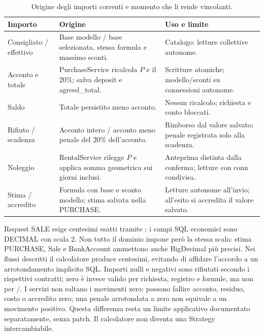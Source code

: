 \begin{table}[htbp]
\centering\small
\caption{Origine degli importi correnti e momento che li rende vincolanti.}\label{tab:impl-importi}
\begin{tabular}{>{\raggedright\arraybackslash}p{.20\linewidth}>{\raggedright\arraybackslash}p{.43\linewidth}>{\raggedright\arraybackslash}p{.27\linewidth}}
\textbf{Importo} & \textbf{Origine} & \textbf{Uso e limite}\\\hline
Consigliato / effettivo & Base modello / base selezionata, stessa formula e massimo sconti. & Catalogo: letture collettive autonome.\\
Acconto e totale & PurchaseService ricalcola $P$ e il 20\%; salva deposit e agreed\_total. & Scritture atomiche; modello/sconti su connessioni autonome.\\
Saldo & Totale persistito meno acconto. & Nessun ricalcolo; richiesta e conto bloccati.\\
Rifiuto / scadenza & Acconto intero / acconto meno penale del 20\% dell'acconto. & Rimborso dal valore salvato; penale registrata solo alla scadenza.\\
Noleggio & RentalService rilegge $P$ e applica somma geometrica sui giorni inclusi. & Anteprima distinta dalla conferma; letture con conn condivisa.\\
Stima / accredito & Formula con base e sconto modello; stima salvata nella PURCHASE. & Letture autonome all'invio; all'esito si accredita il valore salvato.\\\hline
\end{tabular}
\end{table}

Request SALE esige centesimi esatti tramite ; i campi
SQL economici sono DECIMAL con scala 2. Non tutto il dominio impone però
la stessa scala: stima PURCHASE, Sale e BankAccount ammettono anche
BigDecimal più precisi. Nei flussi descritti il calcolatore produce
centesimi, evitando di affidare l'accordo a un arrotondamento implicito SQL.
Importi nulli e negativi sono rifiutati secondo i rispettivi contratti;
zero è invece valido per richiesta, registro e formule, ma non per
/. I servizi non saltano i
movimenti zero: possono fallire acconto, residuo, costo o accredito zero;
una penale arrotondata a zero non equivale a un movimento positivo.
Questa differenza resta un limite applicativo documentato separatamente,
senza patch. Il calcolatore non diventa una Strategy intercambiabile.

